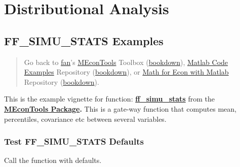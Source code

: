 \documentclass[
]{book}
\begin{document}
\hypertarget{distributional-analysis}{%
\chapter{Distributional Analysis}\label{distributional-analysis}}

\hypertarget{ff_simu_stats-examples}{%
\section{FF\_SIMU\_STATS Examples}\label{ff_simu_stats-examples}}

\begin{quote}
Go back to \href{http://fanwangecon.github.io/}{fan}'s \href{https://fanwangecon.github.io/MEconTools/}{MEconTools} Toolbox (\href{https://fanwangecon.github.io/MEconTools/bookdown}{bookdown}), \href{https://fanwangecon.github.io/M4Econ/}{Matlab Code Examples} Repository (\href{https://fanwangecon.github.io/M4Econ/bookdown}{bookdown}), or \href{https://fanwangecon.github.io/Math4Econ/}{Math for Econ with Matlab} Repository (\href{https://fanwangecon.github.io/Math4Econ/bookdown}{bookdown}).
\end{quote}

This is the example vignette for function:
\href{https://github.com/FanWangEcon/MEconTools/blob/master/MEconTools/stats/ff_simu_stats.m}{\textbf{ff\_simu\_stats}}
from the \href{https://fanwangecon.github.io/MEconTools/}{\textbf{MEconTools
Package}}\textbf{.} This is a
gate-way function that computes mean, percentiles, covariance etc
between several variables.

\hypertarget{test-ff_simu_stats-defaults}{%
\subsection{Test FF\_SIMU\_STATS Defaults}\label{test-ff_simu_stats-defaults}}

Call the function with defaults.
\end{document}
